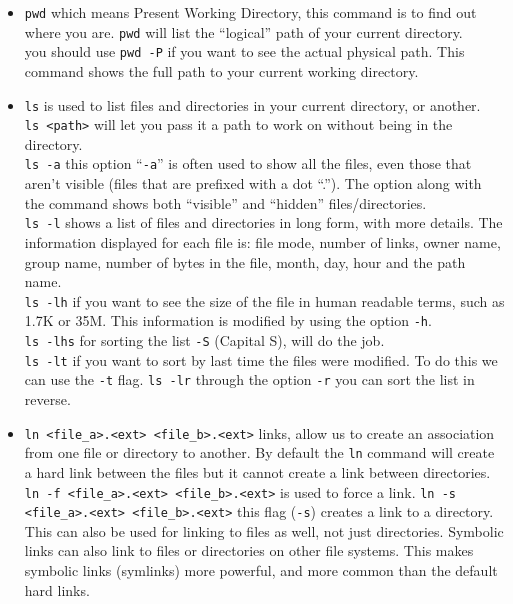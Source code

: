 \documentclass{article}
\begin{document}
    \begin{itemize}
    	\item {\tt pwd} which means Present Working Directory, this command is to find out where you are. {\tt pwd} will list the ``logical'' path of your current directory.\\
    	you should use {\tt pwd -P} if you want to see the actual physical path. This command shows the full path to your current working directory.
    	
    	\item {\tt ls} is used to list files and directories in your current directory, or another.\\
    	{\tt ls <path>} will let you pass it a path to work on without being in the directory.\\
    	{\tt ls -a} this option ``{\tt -a}'' is often used to show all the files, even those that aren't visible (files that are prefixed with a dot ``.''). The option along with the command shows both ``visible'' and ``hidden'' files/directories.\\
    	{\tt ls -l} shows a list of files and directories in long form, with more details. The information displayed for each file is: file mode, number of links, owner name, group name, number of bytes in the file, month, day, hour and the path name.\\
    	{\tt ls -lh} if you want to see the size of the file in human readable terms, such as 1.7K or 35M. This information is modified by using the option {\tt -h}.\\
    	{\tt ls -lhs} for sorting the list {\tt -S} (Capital S), will do the job.\\
    	{\tt ls -lt} if you want to sort by last time the files were modified. To do this we can use the {\tt -t} flag.
    	{\tt ls -lr} through the option {\tt -r} you can sort the list in reverse.
    	
    	\item {\tt ln <file\_a>.<ext> <file\_b>.<ext>} links, allow us to create an association from one file or directory to another. By default the {\tt ln} command will create a hard link between the files but it cannot create a link between directories.\\
    	{\tt ln -f <file\_a>.<ext> <file\_b>.<ext>} is used to force a link.
    	{\tt ln -s <file\_a>.<ext> <file\_b>.<ext>} this flag ({\tt -s}) creates a link to a directory. This can also be used for linking to files as well, not just directories. Symbolic links can also link to files or directories on other file systems. This makes symbolic links (symlinks) more powerful, and more common than the default hard links.
    	

\end{itemize}
\end{document}
